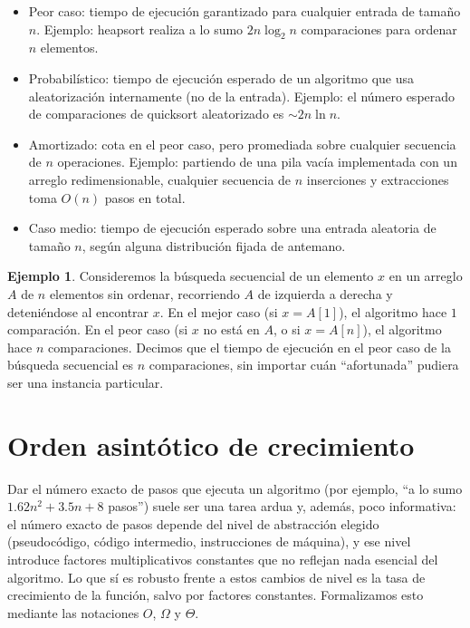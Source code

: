 \documentclass[12pt, spanish, oneside, openany]{book}
\theoremstyle{uprightplain}
\theoremstyle{definition}
\newtheorem{ejemplo}[teorema]{Ejemplo}
\theoremstyle{remark}
\theoremstyle{definition}
\begin{document}
\begin{itemize}
    \item Peor caso: tiempo de ejecución garantizado para cualquier entrada de tamaño $n$. Ejemplo: heapsort realiza a lo sumo $2n\log_2 n$ comparaciones para ordenar $n$ elementos.
    \item Probabilístico: tiempo de ejecución esperado de un algoritmo que usa aleatorización internamente (no de la entrada). Ejemplo: el número esperado de comparaciones de quicksort aleatorizado es $\sim 2n\ln n$.
    \item Amortizado: cota en el peor caso, pero promediada sobre cualquier secuencia de $n$ operaciones. Ejemplo: partiendo de una pila vacía implementada con un arreglo redimensionable, cualquier secuencia de $n$ inserciones y extracciones toma $O(n)$ pasos en total.
    \item Caso medio: tiempo de ejecución esperado sobre una entrada aleatoria de tamaño $n$, según alguna distribución fijada de antemano.
\end{itemize}

\begin{ejemplo}
\label{ej:peor-caso-busqueda}
Consideremos la búsqueda secuencial de un elemento $x$ en un arreglo $A$ de $n$ elementos sin ordenar, recorriendo $A$ de izquierda a derecha y deteniéndose al encontrar $x$. En el mejor caso (si $x=A[1]$), el algoritmo hace $1$ comparación. En el peor caso (si $x$ no está en $A$, o si $x=A[n]$), el algoritmo hace $n$ comparaciones. Decimos que el tiempo de ejecución en el peor caso de la búsqueda secuencial es $n$ comparaciones, sin importar cuán ``afortunada'' pudiera ser una instancia particular.
\end{ejemplo}

\section{Orden asintótico de crecimiento}
\label{sec:orden-asintotico}

Dar el número exacto de pasos que ejecuta un algoritmo (por ejemplo, ``a lo sumo $1.62n^2+3.5n+8$ pasos'') suele ser una tarea ardua y, además, poco informativa: el número exacto de pasos depende del nivel de abstracción elegido (pseudocódigo, código intermedio, instrucciones de máquina), y ese nivel introduce factores multiplicativos constantes que no reflejan nada esencial del algoritmo. Lo que sí es robusto frente a estos cambios de nivel es la tasa de crecimiento de la función, salvo por factores constantes. Formalizamos esto mediante las notaciones $O$, $\Omega$ y $\Theta$.
\end{document}
